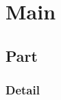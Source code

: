 \documentclass{article}
\begin{document}
\section{Main}
\subsection{Part}
\subsubsection{Detail}
\end{document}
